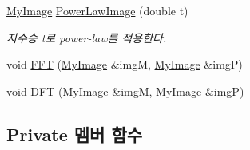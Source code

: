 \begin{DoxyCompactItemize}
\hyperlink{class_my_image}{My\-Image} \hyperlink{class_my_image_aaaab34952da21ff0590b583b72ecc8cb}{Power\-Law\-Image} (double t)
\begin{DoxyCompactList}\small\item\em 지수승 t로 power-\/law를 적용한다. \end{DoxyCompactList}\item 
void \hyperlink{class_my_image_ae5af8001a6f4332d9063837ae6f48df5}{F\-F\-T} (\hyperlink{class_my_image}{My\-Image} \&img\-M, \hyperlink{class_my_image}{My\-Image} \&img\-P)
\item 
void \hyperlink{class_my_image_a7b171aa68f0b7cee751a5b237de4cee4}{D\-F\-T} (\hyperlink{class_my_image}{My\-Image} \&img\-M, \hyperlink{class_my_image}{My\-Image} \&img\-P)
\end{DoxyCompactItemize}
\subsection*{Private 멤버 함수}
